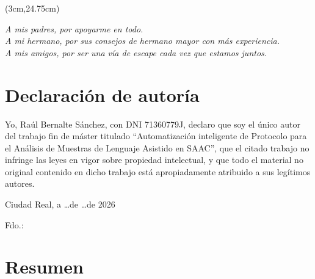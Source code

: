 \begin{textblock*}{\textwidth}(3cm,24.75cm) 
\begin{flushright}
{\fontsize{14pt}{4pt}\selectfont \fecha}
\end{flushright}
\end{textblock*}


\cleardoublepage
\thispagestyle{empty}

\vspace*{9cm}  
\begin{flushright} \em 
A mis padres, por apoyarme en todo. \\
A mi hermano, por sus consejos de hermano mayor con más experiencia. \\
A mis amigos, por ser una vía de escape cada vez que estamos juntos.
\end{flushright}


\cleardoublepage
\thispagestyle{plain}
\chapter*{Declaración de autoría}


Yo, Raúl Bernalte Sánchez, con DNI 71360779J, declaro que soy el único autor del trabajo fin de máster titulado ``Automatización inteligente de Protocolo para el Análisis de Muestras de Lenguaje Asistido en SAAC'', que el citado trabajo no infringe las leyes en vigor sobre propiedad intelectual, y que todo el material no original contenido en dicho trabajo está apropiadamente atribuido a sus legítimos autores.

\vspace*{2cm}
\begin{center}
Ciudad Real, a \quad \ldots \quad de \quad \ldots \quad de 2026

\vskip3cm

Fdo.: \autor
\end{center}


\cleardoublepage
\thispagestyle{plain}
\chapter*{Resumen}

